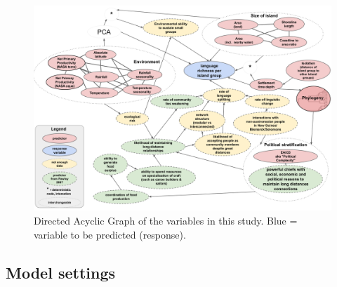 \documentclass[12pt,letterpaper]{article}
\begin{document}
\begin{figure} 

\includegraphics[width=19cm]{Predicting_lgs_DAG_full.png}
\caption{Directed Acyclic Graph of the variables in this study. Blue = variable to be predicted (response).}
\label{Predicting_lgs_DAG_full}
\end{figure}

\newpage
\subsection{Model settings}
\label{appendix_model_settings}
\citep{burkner2017brms}








\end{document}
